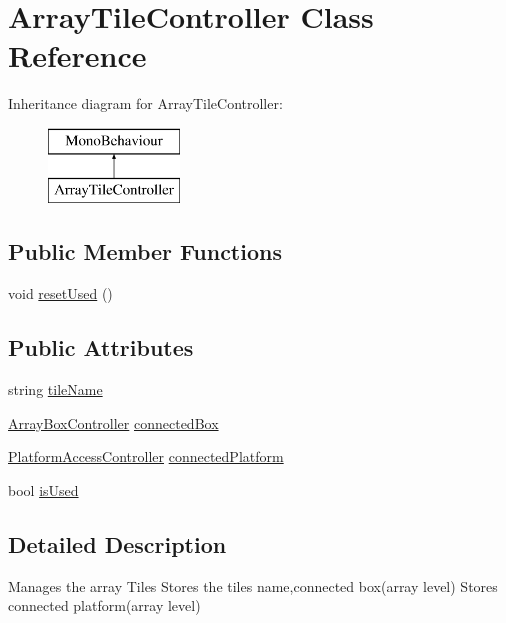 \hypertarget{class_array_tile_controller}{}\section{Array\+Tile\+Controller Class Reference}
\label{class_array_tile_controller}
Inheritance diagram for Array\+Tile\+Controller\+:\begin{figure}[H]
\begin{center}
\leavevmode
\includegraphics[height=2.000000cm]{class_array_tile_controller}
\end{center}
\end{figure}
\subsection*{Public Member Functions}
\begin{DoxyCompactItemize}
\item 
void \hyperlink{class_array_tile_controller_ab8f5d31d582f80a87d6e7ffca8dd9dce}{reset\+Used} ()
\end{DoxyCompactItemize}
\subsection*{Public Attributes}
\begin{DoxyCompactItemize}
\item 
string \hyperlink{class_array_tile_controller_a9f7d6d4fd87723a3e91209f35bc8d5f6}{tile\+Name}
\item 
\hyperlink{class_array_box_controller}{Array\+Box\+Controller} \hyperlink{class_array_tile_controller_a2ad475baebfedaf0690af41e9a243b01}{connected\+Box}
\item 
\hyperlink{class_platform_access_controller}{Platform\+Access\+Controller} \hyperlink{class_array_tile_controller_aadb469bbd5a6e7ae326b5935e50ccd8a}{connected\+Platform}
\item 
bool \hyperlink{class_array_tile_controller_a3a6ff99fac5882cc1db2be7776818e43}{is\+Used}
\end{DoxyCompactItemize}


\subsection{Detailed Description}
Manages the array Tiles Stores the tiles name,connected box(array level) Stores connected platform(array level) 

